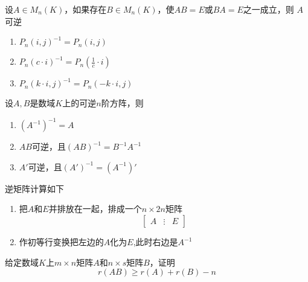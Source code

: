 \documentclass[11pt]{article}
\begin{document}
\begin{corollary}[]
设\(A\in M_n(K)\)，如果存在\(B\in M_n(K)\)，使\(AB=E\)或\(BA=E\)之一成立，则
\(A\)可逆
\end{corollary}

\begin{proposition}[]
\begin{enumerate}
\item \(P_n(i,j)^{-1}=P_n(i,j)\)
\item \(P_n(c\cdot i)^{-1}=P_n(\frac{1}{c}\cdot i)\)
\item \(P_n(k\cdot i,j)^{-1}=P_n(-k\cdot i,j)\)
\end{enumerate}
\end{proposition}

\begin{proposition}[]
设\(A,B\)是数域\(K\)上的可逆\(n\)阶方阵，则
\begin{enumerate}
\item \((A^{-1})^{-1}=A\)
\item \(AB\)可逆，且\((AB)^{-1}=B^{-1}A^{-1}\)
\item \(A'\)可逆，且\((A')^{-1}=(A^{-1})'\)
\end{enumerate}
\end{proposition}

逆矩阵计算如下
\begin{enumerate}
\item 把\(A\)和\(E\)并排放在一起，排成一个\(n\times 2n\)矩阵
\begin{equation*}
\begin{bmatrix}
A&\vdots&E
 \end{bmatrix}
\end{equation*}
\item 作初等行变换把左边的\(A\)化为\(E\),此时右边是\(A^{-1}\)
\end{enumerate}


\begin{proposition}[]
\label{prop2.4.6}
给定数域\(K\)上\(m\times n\)矩阵\(A\)和\(n\times s\)矩阵\(B\)，证明
\begin{equation*}
r(AB)\ge r(A)+r(B)-n
\end{equation*}
\end{proposition}
\end{document}
